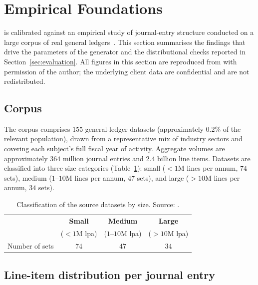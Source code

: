 \section{Empirical Foundations}
\label{sec:empirical}

\bench{} is calibrated against an empirical study of journal-entry
structure conducted on a large corpus of real general
ledgers~\citep{ivertowski2024apn}.  This section summarises the
findings that drive the parameters of the \system{} generator and the
distributional checks reported in Section~\ref{sec:evaluation}.  All
figures in this section are reproduced from
\citet{ivertowski2024apn} with permission of the author; the
underlying client data are confidential and are not redistributed.

\subsection{Corpus}
\label{sec:empirical:corpus}

The corpus comprises $155$ general-ledger datasets (approximately
$0.2\%$ of the relevant population), drawn from a representative
mix of industry sectors and covering each subject's full fiscal year
of activity.  Aggregate volumes are approximately $364$ million
journal entries and $2.4$ billion line items.  Datasets are
classified into three size categories
(Table~\ref{tab:emp:size}): small ($<\!1$M lines per annum,
$74$ sets), medium ($1$--$10$M lines per annum, $47$ sets), and
large ($>\!10$M lines per annum, $34$ sets).

\begin{table}[H]
  \centering
  \caption{Classification of the source datasets by size.  Source:
    \citet{ivertowski2024apn}.}
  \label{tab:emp:size}
  \begin{tabular}{lccc}
    \toprule
                  & \textbf{Small} & \textbf{Medium} & \textbf{Large}\\
                  & ($<\!1$M lpa)  & ($1$--$10$M lpa) & ($>\!10$M lpa)\\
    \midrule
    Number of sets & $74$ & $47$ & $34$\\
    \bottomrule
  \end{tabular}
\end{table}

\subsection{Line-item distribution per journal entry}
\label{sec:empirical:line-items}

